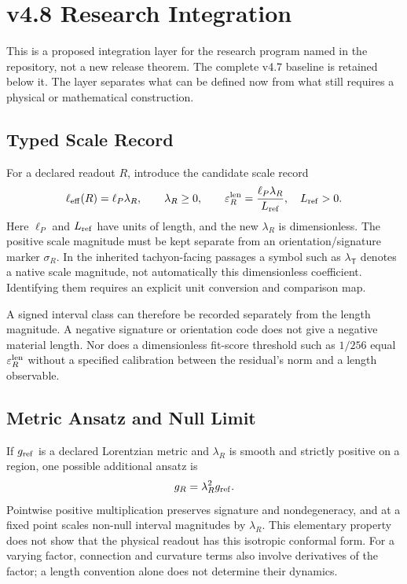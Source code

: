 \section{v4.8 Research Integration}
\label{v480:integration}

This is a proposed integration layer for the research program named in
the repository, not a new release theorem. The complete v4.7 baseline
is retained below it. The layer separates what can be defined now from
what still requires a physical or mathematical construction.

\subsection{Typed Scale Record}
\label{v480:scale-record}

For a declared readout $R$, introduce the candidate scale record
\[
 \ell_{\rm eff}(R)=\ell_P\lambda_R,\qquad
 \lambda_R\geq0,
 \qquad \varepsilon_R^{\rm len}
       =\frac{\ell_P\lambda_R}{L_{\rm ref}},\quad L_{\rm ref}>0.
\]
Here $\ell_P$ and $L_{\rm ref}$ have units of length, and the new
$\lambda_R$ is dimensionless. The positive scale magnitude must be
kept separate from an orientation/signature marker $\sigma_R$.
In the inherited tachyon-facing passages a symbol such as
$\lambda_{\mathsf T}$ denotes a native scale magnitude, not
automatically this dimensionless coefficient. Identifying them
requires an explicit unit conversion and comparison map.

A signed interval class can therefore be recorded separately from
the length magnitude. A negative signature or orientation code
does not give a negative material length. Nor does a dimensionless
fit-score threshold such as $1/256$ equal
$\varepsilon_R^{\rm len}$ without a specified calibration between
the residual's norm and a length observable.

\subsection{Metric Ansatz and Null Limit}
\label{v480:metric-candidate}

If $g_{\rm ref}$ is a declared Lorentzian metric and $\lambda_R$
is smooth and strictly positive on a region, one possible additional
ansatz is
\[
 g_R=\lambda_R^2 g_{\rm ref}.
\]
Pointwise positive multiplication preserves signature and
nondegeneracy, and at a fixed point scales non-null interval
magnitudes by $\lambda_R$. This elementary property does not show
that the physical readout has this isotropic conformal form.
For a varying factor, connection and curvature terms also involve
derivatives of the factor; a length convention alone does not
determine their dynamics.

